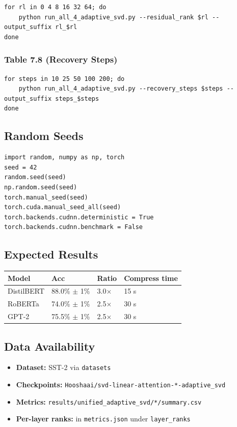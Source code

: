\begin{lstlisting}
for rl in 0 4 8 16 32 64; do
    python run_all_4_adaptive_svd.py --residual_rank $rl --output_suffix rl_$rl
done
\end{lstlisting}

\subsubsection{Table 7.8 (Recovery Steps)}

\begin{lstlisting}
for steps in 10 25 50 100 200; do
    python run_all_4_adaptive_svd.py --recovery_steps $steps --output_suffix steps_$steps
done
\end{lstlisting}

\subsection{Random Seeds}

\begin{lstlisting}
import random, numpy as np, torch
seed = 42
random.seed(seed)
np.random.seed(seed)
torch.manual_seed(seed)
torch.cuda.manual_seed_all(seed)
torch.backends.cudnn.deterministic = True
torch.backends.cudnn.benchmark = False
\end{lstlisting}

\subsection{Expected Results}

\begin{table}[H]
\centering
\small
\begin{tabular}{llll}
\toprule
\textbf{Model} & \textbf{Acc} & \textbf{Ratio} & \textbf{Compress time} \\
\midrule
DistilBERT & 88.0\% $\pm$ 1\% & 3.0$\times$ & 15 s \\
RoBERTa & 74.0\% $\pm$ 1\% & 2.5$\times$ & 30 s \\
GPT-2 & 75.5\% $\pm$ 1\% & 2.5$\times$ & 30 s \\
\bottomrule
\end{tabular}
\end{table}

\subsection{Data Availability}

\begin{itemize}
\item \textbf{Dataset:} SST-2 via \texttt{datasets}
\item \textbf{Checkpoints:} \texttt{Hooshaai/svd-linear-attention-*-adaptive\_svd}
\item \textbf{Metrics:} \texttt{results/unified\_adaptive\_svd/*/summary.csv}
\item \textbf{Per-layer ranks:} in \texttt{metrics.json} under \texttt{layer\_ranks}

\end{itemize}
